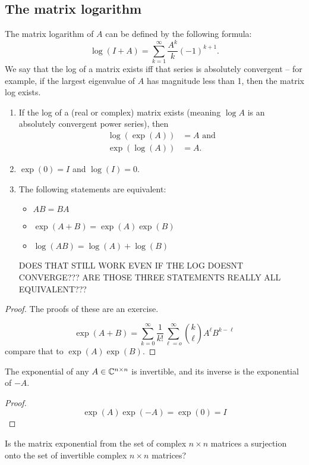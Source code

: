 \documentclass[class=article, crop=false]{standalone}
\begin{document}
\subsection{The matrix logarithm}
The matrix logarithm of $A$ can be defined by the following formula:
\[ \log (I+A) = \sum_{k=1}^\infty \frac{A^k}{k} (-1)^{k+1}. \]
We say that the log of a matrix exists iff that series is absolutely convergent -- for example, if the largest eigenvalue of $A$ has magnitude less than 1, then the matrix log exists.
\begin{thm}
    \begin{enumerate}
    \item If the log of a (real or complex) matrix exists (meaning $\log A$ is an absolutely convergent power series), then
    \begin{align*}
        \log(\exp(A))&=A \text{    and} \\
        \exp(\log(A))&=A.
    \end{align*}
\item $\exp(0)=I$ and $\log(I)=0$.
\item The following statements are equivalent:
    \begin{itemize}
        \item $AB=BA$
        \item $\exp(A+B)=\exp(A)\exp(B)$
        \item $\log(AB)=\log(A)+\log(B)$
    \end{itemize}
    DOES THAT STILL WORK EVEN IF THE LOG DOESNT CONVERGE??? ARE THOSE THREE STATEMENTS REALLY ALL EQUIVALENT???
    \end{enumerate}
\end{thm}
\begin{proof}
    The proofs of these are an exercise.
    \par
    \[ \exp(A+B)=\sum_{k=0}^\infty \frac{1}{k!} \sum_{\ell=o}^\infty \binom{k}{\ell} A^\ell B^{k-\ell} \]
    compare that to $\exp(A)\exp(B)$.
\end{proof}
\begin{thm}
    The exponential of any $A \in \mathbb{C}^{n \times n}$ is invertible, and its inverse is the exponential of $-A$.
\end{thm}
\begin{proof}
    \[ \exp(A)\exp(-A)=\exp(0)=I \]
\end{proof}
\begin{prob}
    Is the matrix exponential from the set of complex $n \times n$ matrices a surjection onto the set of invertible complex $n \times n$ matrices?
\end{prob}
\end{document}
